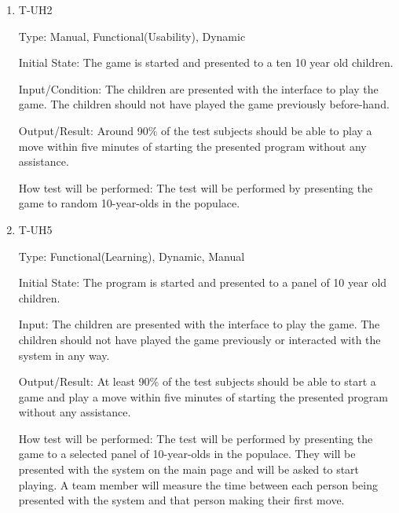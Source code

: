 \documentclass[12pt, titlepage]{article}
\begin{document}
        \begin{enumerate}
        
            \item{T-UH2\\}
            
                Type: Manual, Functional(Usability), Dynamic
                					
                Initial State: The game is started and presented to a ten 10 year old children.
                
                Input/Condition: The children are presented with the interface to play the game.
                The children should not have played the game previously before-hand.
                					
                Output/Result: Around 90\% of the test subjects should be able to play a move within five minutes of starting the presented program without any assistance.
                					
                How test will be performed: The test will be performed by presenting the game to random 10-year-olds in the populace.
            					
            \item{T-UH5\\}
            
                Type: Functional(Learning), Dynamic, Manual
                					
                Initial State: The program is started and presented to a panel of 10 year old children.
                					
                Input: The children are presented with the interface to play the game.
                The children should not have played the game previously or interacted with the system in any way.
                					
                Output/Result: At least 90\% of the test subjects should be able to start a game and play a move within five minutes of starting the presented program without any assistance.
        
                How test will be performed: The test will be performed by presenting the game to a selected panel of 10-year-olds in the populace. They will be presented with the system on the main page and will be asked to start playing. A team member will measure the time between each person being presented with the system and that person making their first move.
        
        \end{enumerate}
\end{document}
